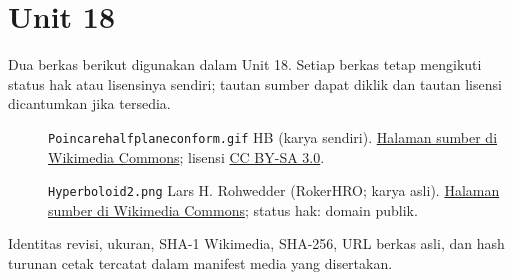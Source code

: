 \section*{Unit 18}
Dua berkas berikut digunakan dalam Unit 18. Setiap berkas tetap mengikuti status hak atau lisensinya sendiri; tautan sumber dapat diklik dan tautan lisensi dicantumkan jika tersedia.
\begin{description}
\item[]\texttt{Poincarehalfplaneconform.gif}
HB (karya sendiri).
\href{https://commons.wikimedia.org/wiki/File:Poincarehalfplaneconform.gif}{Halaman sumber di Wikimedia Commons}; lisensi \href{https://creativecommons.org/licenses/by-sa/3.0/}{CC BY-SA 3.0}.
\item[]\texttt{Hyperboloid2.png}
Lars H. Rohwedder (RokerHRO; karya asli).
\href{https://commons.wikimedia.org/wiki/File:Hyperboloid2.png}{Halaman sumber di Wikimedia Commons}; status hak: domain publik.
\end{description}
Identitas revisi, ukuran, SHA-1 Wikimedia, SHA-256, URL berkas asli, dan hash turunan cetak tercatat dalam manifest media yang disertakan.
